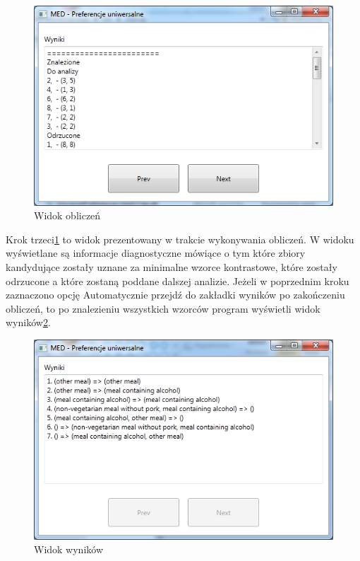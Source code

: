 \documentclass[a4paper,12pt]{article}
\begin{document}
\begin{figure}[h!]
\begin{center}
\includegraphics[width=\textwidth]{img/3.png}
\caption{Widok obliczeń}
\label{krok3}
\end{center}
\end{figure}

Krok trzeci\ref{krok3} to widok prezentowany w trakcie wykonywania obliczeń. W widoku wyświetlane są informacje diagnostyczne mówiące o tym które zbiory kandydujące zostały uznane za minimalne wzorce kontrastowe, które zostały odrzucone a które zostaną poddane dalszej analizie. Jeżeli w poprzednim kroku zaznaczono opcję Automatycznie przejdź do zakładki wyników po zakończeniu obliczeń, to po znalezieniu wszystkich wzorców program wyświetli widok wyników\ref{krok4}.\\

\begin{figure}[h!]
\begin{center}
\includegraphics[width=\textwidth]{img/4.png}
\caption{Widok wyników}
\label{krok4}
\end{center}
\end{figure}



\end{document}
